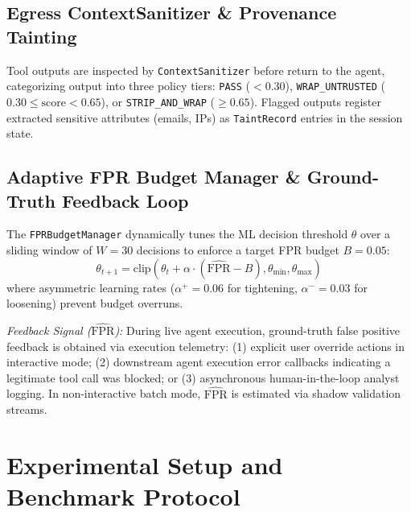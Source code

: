 \documentclass[runningheads]{llncs}
\begin{document}
\subsection{Egress ContextSanitizer \& Provenance Tainting}
Tool outputs are inspected by \texttt{ContextSanitizer} before return to the agent, categorizing output into three policy tiers: \texttt{PASS} ($< 0.30$), \texttt{WRAP\_UNTRUSTED} ($0.30 \le \text{score} < 0.65$), or \texttt{STRIP\_AND\_WRAP} ($\ge 0.65$). Flagged outputs register extracted sensitive attributes (emails, IPs) as \texttt{TaintRecord} entries in the session state.

\subsection{Adaptive FPR Budget Manager \& Ground-Truth Feedback Loop}
The \texttt{FPRBudgetManager} dynamically tunes the ML decision threshold $\theta$ over a sliding window of $W = 30$ decisions to enforce a target FPR budget $B = 0.05$:
\begin{equation}
\theta_{t+1} = \text{clip}\left(\theta_t + \alpha \cdot (\widehat{\text{FPR}} - B), \theta_{\min}, \theta_{\max}\right)
\end{equation}
where asymmetric learning rates ($\alpha^+ = 0.06$ for tightening, $\alpha^- = 0.03$ for loosening) prevent budget overruns.

\textit{Feedback Signal ($\widehat{\text{FPR}}$):} During live agent execution, ground-truth false positive feedback is obtained via execution telemetry: (1) explicit user override actions in interactive mode; (2) downstream agent execution error callbacks indicating a legitimate tool call was blocked; or (3) asynchronous human-in-the-loop analyst logging. In non-interactive batch mode, $\widehat{\text{FPR}}$ is estimated via shadow validation streams.

\section{Experimental Setup and Benchmark Protocol}
\end{document}
